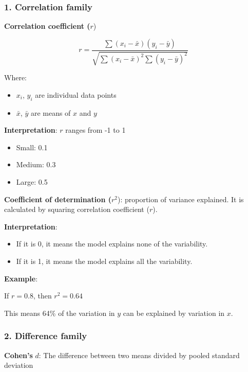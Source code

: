 \documentclass[
]{book}
\newcounter{none} %
\providecommand{\tightlist}{%
  \setlength{\itemsep}{0pt}\setlength{\parskip}{0pt}}
\begin{document}
\subsubsection{1. Correlation family}\label{correlation-family}

\textbf{Correlation coefficient (}\(r\))

\[r = \frac{\sum (x_i - \bar{x})(y_i - \bar{y})}{\sqrt{\sum (x_i - \bar{x})^2 \sum (y_i - \bar{y})^2}}\]

Where:

\begin{itemize}
\tightlist
\item
  \(x_i\), \(y_i\) are individual data points
\item
  \(\bar{x}\), \(\bar{y}\) are means of \(x\) and \(y\)
\end{itemize}

\textbf{Interpretation}: \(r\) ranges from -1 to 1

\begin{itemize}
\tightlist
\item
  Small: 0.1
\item
  Medium: 0.3
\item
  Large: 0.5
\end{itemize}

\textbf{Coefficient of determination (}\(r^2\)): proportion of variance explained. It is calculated by squaring correlation coefficient (\(r\)).

\textbf{Interpretation}:

\begin{itemize}
\tightlist
\item
  If it is 0, it means the model explains none of the variability.
\item
  If it is 1, it means the model explains all the variability.
\end{itemize}

\textbf{Example}:

If \(r = 0.8\), then \(r^2 = 0.64\)

This means 64\% of the variation in \(y\) can be explained by variation in \(x\).

\subsubsection{2. Difference family}\label{difference-family}

\textbf{Cohen's} \(d\): The difference between two means divided by pooled standard deviation
\end{document}
